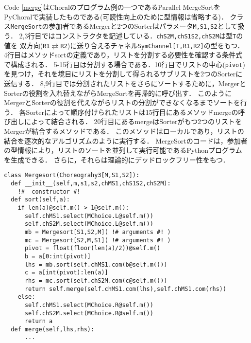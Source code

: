 \documentclass{resume}
\begin{document}
Code \ref{merge}はChoralのプログラム例の一つであるParallel MergeSortをPyChoralで実装したものである(可読性向上のために型情報は省略する)．
クラス\texttt{MergeSort}の参加者であるMergerと2つのSorterはパラメータ\texttt{M,S1,S2}として扱う．
2,3行目ではコンストラクタを記述している．\texttt{chS2M,chS1S2,chS2M}は型\texttt{T}の値を
双方向(\texttt{R1}$\rightleftarrows$\texttt{R2})に送り合えるチャネル\texttt{SymChannel[T,R1,R2]}の型をもつ．
4行目はメソッド\textsf{sort}の定義であり，リストを分割する必要性を確認する条件式で構成される．
5-15行目は分割する場合である．10行目でリストの中心(\texttt{pivot})を見つけ，それを境目にリストを分割して得られるサブリストを2つのSorterに送信する．
8,9行目では分割されたリストをさらにソートするために，MergerとSorterの役割を入れ替えながらMergeSortを再帰的に呼び出す．
このようにMergerとSorterの役割を代えながらリストの分割ができなくなるまでソートを行う．
各Sorterによって順序付けられたリストは15行目にあるメソッド\textsf{merge}の呼び出しによって結合される．
20行目にある\textsf{merge}はSorterがもつ2つのリストをMergerが結合するメソッドである．
このメソッドはローカルであり，リストの結合を逐次的なアルゴリズムのように実行する．
MergeSortのコードは，参加者の型情報により，リストのソートを並列して実行可能であるPythonプログラムを生成できる．
さらに，それらは理論的にデッドロックフリー性をもつ．
      
\begin{lstlisting}[caption = MergeSort.py, label = merge]
class Mergesort(Choreograhy3[M,S1,S2]):
  def __init__(self,m,s1,s2,chMS1,chS1S2,chS2M):
    !#  constructor #!
  def sort(self,a):
    if len(a)@self.m() > 1@self.m():
      self.chMS1.select(MChoice.L@self.m())
      self.chS2M.select(MChoice.L@self.m())
      mb = Mergesort[S1,S2,M]( !# arguments #! )
      mc = Mergesort[S2,M,S1]( !# arguments #! )
      pivot = float(floor(len(a)/2))@self.m()
      b = a[0:int(pivot)]
      lhs = mb.sort(self.chMS1.com(b@self.m()))
      c = a[int(pivot):len(a)]
      rhs = mc.sort(self.chS2M.com(c@self.m()))
      return self.merge(self.chMS1.com(lhs),self.chMS1.com(rhs))
    else:
      self.chMS1.select(MChoice.R@self.m())
      self.chS2M.select(MChoice.R@self.m())
      return a
  def merge(self,lhs,rhs):
      ... 
\end{lstlisting}
\end{document}
